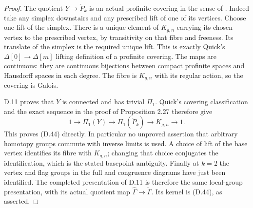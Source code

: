 \begin{proof}
The quotient $Y\to\check P_k$ is an actual profinite
covering in the sense of
\cite[\S2.1, Propositions 2.2 and 2.27]{D_Quick2008}.
Indeed take any simplex downstairs and any prescribed
lift of one of its vertices.  Choose one lift of
the simplex.  There is a unique element of $K_{g,n}$
carrying its chosen vertex to the prescribed vertex,
by transitivity on that fibre and freeness.  Its
translate of the simplex is the required unique
lift.  This is exactly Quick's
$\Delta[0]\to\Delta[m]$ lifting definition of a
profinite covering.  The maps are continuous:
they are continuous bijections between compact
profinite spaces and Hausdorff spaces in each
degree.  The fibre is $K_{g,n}$ with its regular
action, so the covering is Galois.

D.11 proves that $Y$ is connected and has trivial
$\Pi_1$.  Quick's covering classification and the
exact sequence in the proof of Proposition 2.27
therefore give
\[
 1\longrightarrow\Pi_1(Y)\longrightarrow
 \Pi_1(\check P_k)\longrightarrow K_{g,n}\longrightarrow1.
\]
This proves (D.44) directly.  In particular no
unproved assertion that arbitrary homotopy groups
commute with inverse limits is used.  A choice of
lift of the base vertex identifies its fibre with
$K_{g,n}$; changing that choice conjugates the
identification, which is the stated basepoint
ambiguity.  Finally at $k=2$ the vertex and flag
groups in the full and congruence diagrams have
just been identified.  The completed presentation
of D.11 is therefore the same local-group
presentation, with its actual quotient map
$\widehat\Gamma\to\check\Gamma$.  Its kernel is
(D.44), as asserted.
\end{proof}
